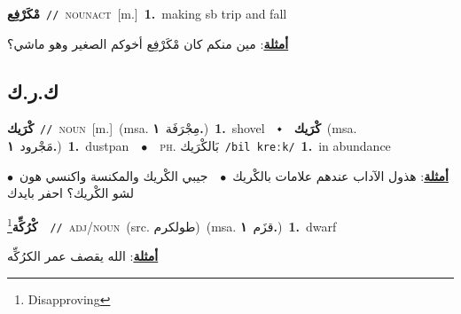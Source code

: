 \documentclass[10pt,a4paper,twoside]{article} %
\begin{document}
\begin{multicols}{2}
{\setlength\topsep{0pt}\textbf{\foreignlanguage{arabic}{مْكَرْفِع}}\ {\color{gray}\texttt{//}\color{black}}\ \textsc{noun\textunderscore act}\ [m.]\ \textbf{1.}~making sb trip and fall\  \begin{flushright}\color{gray}\foreignlanguage{arabic}{\textbf{\underline{\foreignlanguage{arabic}{أمثلة}}}: مين منكم كان مْكَرْفِع أخوكم الصغير وهو ماشي؟}\end{flushright}\color{black}} \vspace{2mm}

\vspace{-3mm}
\subsection*{\color{blue}\foreignlanguage{arabic}{ك.ر.ك}\color{blue}{}} 

{\setlength\topsep{0pt}\textbf{\foreignlanguage{arabic}{كْرَيك}}\ {\color{gray}\texttt{//}\color{black}}\ \textsc{noun}\ [m.]\ \color{gray}(msa. \foreignlanguage{arabic}{مِجْرَفَة}~\foreignlanguage{arabic}{\textbf{١.}})\color{black}\ \textbf{1.}~shovel\ \ $\smblkdiamond$\ \ \setlength\topsep{0pt}\textbf{\foreignlanguage{arabic}{كْرَيك}}\ \color{gray}(msa. \foreignlanguage{arabic}{مَجْرود}~\foreignlanguage{arabic}{\textbf{١.}})\color{black}\ \textbf{1.}~dustpan\ \ $\bullet$\ \ \textsc{ph.} \color{gray} \foreignlanguage{arabic}{بَالكْرَيك}\color{black}\ {\color{gray}\texttt{/{\sffamily bil kreːk}/}\color{black}}\ \textbf{1.}~in abundance\  \begin{flushright}\color{gray}\foreignlanguage{arabic}{\textbf{\underline{\foreignlanguage{arabic}{أمثلة}}}: هذول الآداب عندهم علامات بالكْريك\ $\bullet$\ \  جيبي الكْريك والمكنسة واكنسي هون\ $\bullet$\ \  لشو الكْريك؟ احفر بايدك}\end{flushright}\color{black}} \vspace{2mm}

{\setlength\topsep{0pt}\textbf{\foreignlanguage{arabic}{كْرُكِّة}}\footnote{Disapproving}\ \ {\color{gray}\texttt{//}\color{black}}\ \textsc{adj/noun}\ (src. \color{gray}\foreignlanguage{arabic}{طولكرم}\color{black})\ \color{gray}(msa. \foreignlanguage{arabic}{قزَم}~\foreignlanguage{arabic}{\textbf{١.}})\color{black}\ \textbf{1.}~dwarf\  \begin{flushright}\color{gray}\foreignlanguage{arabic}{\textbf{\underline{\foreignlanguage{arabic}{أمثلة}}}: الله يقصف عمر الكرُكِّه}\end{flushright}\color{black}} \vspace{2mm}


\end{multicols}
\end{document}
